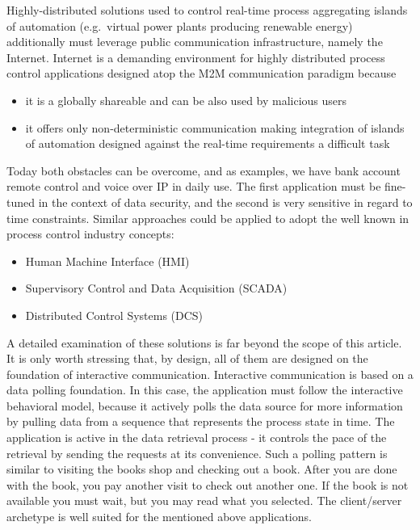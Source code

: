 \documentclass[runningheads]{llncs}
\begin{document}
Highly-distributed solutions used to control real-time process aggregating islands of automation (e.g.~virtual power plants producing renewable energy) additionally must leverage public communication infrastructure, namely the Internet. Internet is a demanding environment for highly distributed process control applications designed atop the M2M communication paradigm because

\begin{itemize}
      \item it is a globally shareable and can be also used by malicious users
      \item it offers only non-deterministic communication making integration of islands of automation designed against the real-time requirements a difficult task
\end{itemize}

Today both obstacles can be overcome, and as examples, we have bank account remote control and voice over IP in daily use. The first application must be fine-tuned in the context of data security, and the second is very sensitive in regard to time constraints. Similar approaches could be applied to adopt the well known in process control industry concepts:

\begin{itemize}
      \item  Human Machine Interface (HMI)
      \item Supervisory Control and Data Acquisition (SCADA)
      \item Distributed Control Systems (DCS)
\end{itemize}

A detailed examination of these solutions is far beyond the scope of this article. It is only worth stressing that, by design, all of them are designed on the foundation of interactive communication. Interactive communication is based on a data polling foundation. In this case, the application must follow the interactive behavioral model, because it actively polls the data source for more information by pulling data from a sequence that represents the process state in time. The application is active in the data retrieval process - it controls the pace of the retrieval by sending the requests at its convenience. Such a polling pattern is similar to visiting the books shop and checking out a book. After you are done with the book, you pay another visit to check out another one. If the book is not available you must wait, but you may read what you selected. The client/server archetype is well suited for the mentioned above applications.
\end{document}
